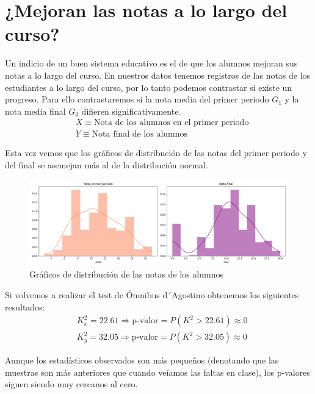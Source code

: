 \section{¿Mejoran las notas a lo largo del curso?}

Un indicio de un buen sistema educativo es el de que los alumnos mejoran sus notas a lo largo del curso. En nuestros datos tenemos registros de las notas de los estudiantes a lo largo del curso, por lo tanto podemos contrastar si existe un progreso. Para ello contrastaremos si la nota media del primer periodo $G_{1}$ y la nota media final $G_{3}$ difieren significativamente.
\begin{equation*}
    \begin{split}
        & X \equiv \text{Nota de los alumnos en el primer periodo}\\
        & Y \equiv \text{Nota final de los alumnos}
    \end{split} 
\end{equation*}

Esta vez vemos que los gráficos de distribución de las notas del primer periodo y del final se asemejan más al de la distribución normal.

\begin{figure}[H]
    \centering
    \includegraphics[width=1\textwidth]{./figures/dist-notas-alumnos.png}
    \caption{Gráficos de distribución de las notas de los alumnos}
    \label{fig:dist-notas}
\end{figure}

Si volvemos a realizar el test de Ómnibus d´Agostino obtenemos los siguientes resultados:
\begin{equation*}
    \begin{split}
        & K^2_{x} = 22.61 \Rightarrow \text{p-valor} = P(K^2 > 22.61) \approx 0\\ 
        & K^2_{y} = 32.05 \Rightarrow \text{p-valor} = P(K^2 > 32.05) \approx 0
    \end{split}
\end{equation*}

Aunque los estadísticos observados son más pequeños (denotando que las muestras son más anteriores que cuando veíamos las faltas en clase), los p-valores siguen siendo muy cercanos al cero.

